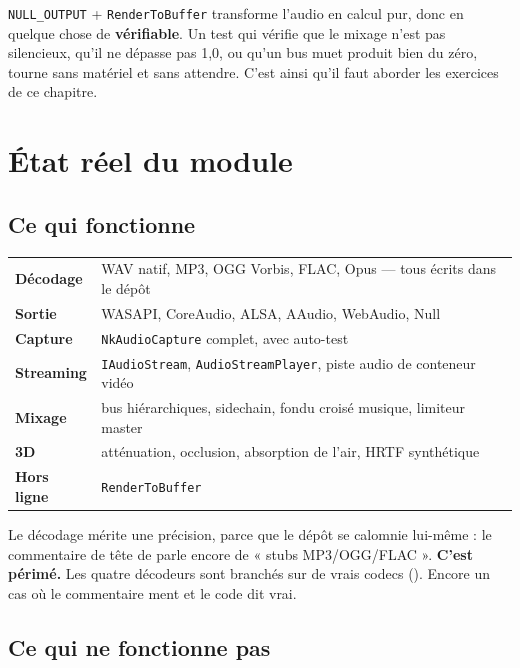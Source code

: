 \begin{nkretenir}
\texttt{NULL\_OUTPUT} + \texttt{RenderToBuffer} transforme l'audio en calcul pur,
donc en quelque chose de \textbf{vérifiable}. Un test qui vérifie que le mixage
n'est pas silencieux, qu'il ne dépasse pas 1,0, ou qu'un bus muet produit bien
du zéro, tourne sans matériel et sans attendre. C'est ainsi qu'il faut aborder
les exercices de ce chapitre.
\end{nkretenir}

\section{État réel du module}

\subsection{Ce qui fonctionne}

\begin{center}
\begin{tabular}{@{}ll@{}}
\toprule
\textbf{Décodage} & WAV natif, MP3, OGG Vorbis, FLAC, Opus — tous écrits dans le dépôt \\
\textbf{Sortie}   & WASAPI, CoreAudio, ALSA, AAudio, WebAudio, Null \\
\textbf{Capture}  & \texttt{NkAudioCapture} complet, avec auto-test \\
\textbf{Streaming}& \texttt{IAudioStream}, \texttt{AudioStreamPlayer}, piste audio de conteneur vidéo \\
\textbf{Mixage}   & bus hiérarchiques, sidechain, fondu croisé musique, limiteur master \\
\textbf{3D}       & atténuation, occlusion, absorption de l'air, HRTF synthétique \\
\textbf{Hors ligne} & \texttt{RenderToBuffer} \\
\bottomrule
\end{tabular}
\end{center}

Le décodage mérite une précision, parce que le dépôt se calomnie lui-même : le
commentaire de tête de  parle encore de « stubs
MP3/OGG/FLAC ». \textbf{C'est périmé.} Les quatre décodeurs sont branchés sur de
vrais codecs (). Encore un cas où le
commentaire ment et le code dit vrai.

\subsection{Ce qui ne fonctionne pas}


